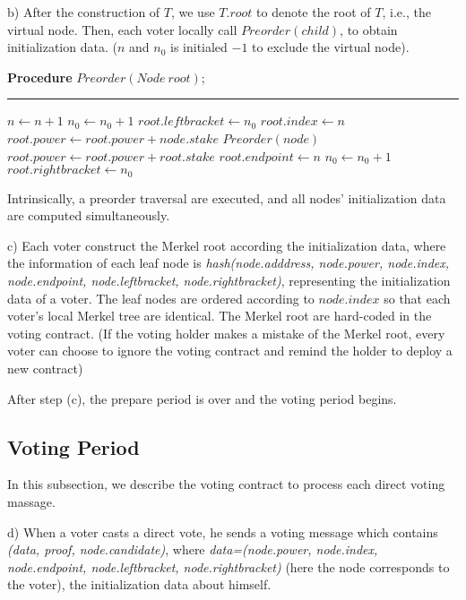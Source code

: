 b) After the construction of $T$, we use $T.root$ to denote the root of $T$, i.e., the virtual node. Then, each voter locally call $Preorder(child)$, to obtain initialization data. ($n$ and $n_0$ is initialed $-1$ to exclude the virtual node).

\begin{algorithm}
	\label{alg:preorder}
	\textbf{Procedure} $Preorder(Node~root)$;
	\hrule
	$n \leftarrow n+1$\;
	$n_0 \leftarrow n_0+1$\;
	$root.leftbracket \leftarrow n_0$\;
	$root.index \leftarrow n$\;
	{
		$root.power \leftarrow root.power+node.stake$\;
		$Preorder(node)$
	}
    $root.power \leftarrow root.power+root.stake$\;
	$root.endpoint \leftarrow n$\;
	$n_0 \leftarrow n_0+1$\;
	$root.rightbracket \leftarrow n_0$\;
\end{algorithm}
Intrinsically, a preorder traversal are executed, and all nodes' initialization data are computed simultaneously. 

c) Each voter construct the Merkel root according the initialization data, where the information of each leaf node is {\em hash(node.adddress, node.power, node.index, node.endpoint, node.leftbracket, node.rightbracket)}, representing the initialization data of a voter. The leaf nodes are ordered according to $node.index$ so that each voter's local Merkel tree are identical. The  Merkel root are hard-coded in the voting contract. (If the voting holder makes a mistake of the Merkel root, every voter can choose to ignore the voting contract and remind the holder to deploy a new contract)

After step (c), the prepare period is over and the voting period begins.
\subsection{Voting Period}
In this subsection, we describe the voting contract to process each direct voting massage. 

d) When a voter casts a direct vote, he sends a voting message which contains {\em(data, proof, node.candidate)}, where {\em data=(node.power, node.index, node.endpoint, node.leftbracket, node.rightbracket)} (here the node corresponds to the voter), the initialization data about himself. 

